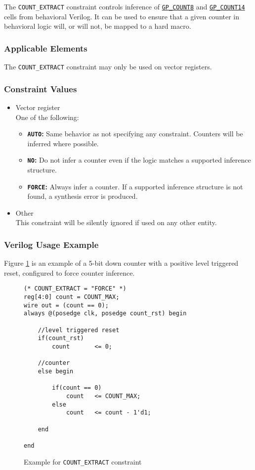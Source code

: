\documentclass[11pt]{article}
\newcommand{\tokenstyle}[1]{\texttt{#1}}
\newcommand{\valuestyle}[1]{\texttt{#1}}
\newcommand{\strvaluestyle}[1]{\valuestyle{\textquotedbl#1\textquotedbl}}
\newcommand{\strexamplestyle}[1]{\textbf{\strvaluestyle{#1}:}}
\newcommand{\whenstyle}[1]{{\fontseries{sb}\selectfont#1}}
\newcommand{\tokenref}[2]{\hyperref[#2]{\tokenstyle{#1}}}
\begin{document}
The \tokenstyle{COUNT\_EXTRACT} constraint controls inference of \tokenref{GP\_COUNT8}{gp-count8} and \tokenref{GP\_COUNT14}{gp-count14} cells from behavioral Verilog. It can be
used to ensure that a given counter in behavioral logic will, or will not, be mapped to a hard macro.

\subsubsection{Applicable Elements}
The \tokenstyle{COUNT\_EXTRACT} constraint may only be used on vector registers.

\subsubsection{Constraint Values}
\begin{itemize}
\item \whenstyle{Vector register}\\
One of the following:
\begin{itemize}
\item \strexamplestyle{AUTO} Same behavior as not specifying any constraint. Counters will be inferred where possible.
\item \strexamplestyle{NO} Do not infer a counter even if the logic matches a supported inference structure.
\item \strexamplestyle{FORCE} Always infer a counter. If a supported inference structure is not found, a synthesis error is produced.
\end{itemize}
\item \whenstyle{Other} \\
This constraint will be silently ignored if used on any other entity.
\end{itemize}

\subsubsection{Verilog Usage Example}

Figure \ref{constraint-count-extract} is an example of a 5-bit down counter with a positive level triggered reset,
configured to force counter inference.

\begin{figure}[h]
\begin{lstlisting}
(* COUNT_EXTRACT = "FORCE" *)
reg[4:0] count = COUNT_MAX;
wire out = (count == 0);
always @(posedge clk, posedge count_rst) begin

	//level triggered reset
	if(count_rst)
		count		<= 0;

	//counter
	else begin

		if(count == 0)
			count	<= COUNT_MAX;
		else
			count	<= count - 1'd1;

	end

end
\end{lstlisting}
\caption{Example for \tokenstyle{COUNT\_EXTRACT} constraint}
\label{constraint-count-extract}
\end{figure}
\end{document}
